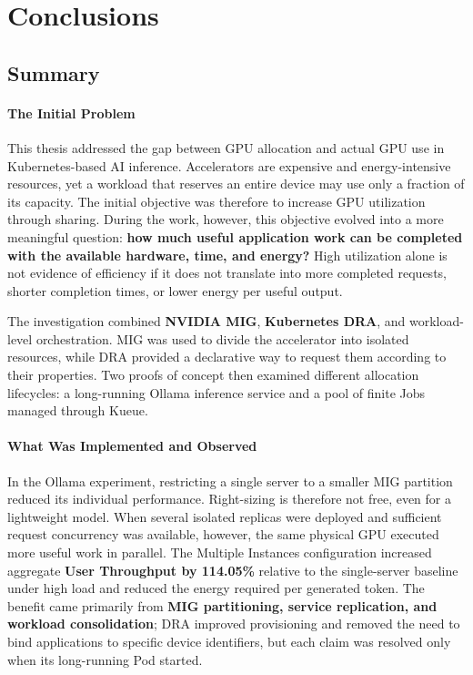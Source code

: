 \chapter{Conclusions}
\label{chap:conclusions}

\section{Summary}
\label{sec:conclusion-summary}

\subsubsection*{The Initial Problem}

This thesis addressed the gap between GPU allocation and actual GPU use in Kubernetes-based AI inference. Accelerators are expensive and energy-intensive resources, yet a workload that reserves an entire device may use only a fraction of its capacity. The initial objective was therefore to increase GPU utilization through sharing. During the work, however, this objective evolved into a more meaningful question: \textbf{how much useful application work can be completed with the available hardware, time, and energy?} High utilization alone is not evidence of efficiency if it does not translate into more completed requests, shorter completion times, or lower energy per useful output.

The investigation combined \textbf{NVIDIA MIG}, \textbf{Kubernetes DRA}, and workload-level orchestration. MIG was used to divide the accelerator into isolated resources, while DRA provided a declarative way to request them according to their properties. Two proofs of concept then examined different allocation lifecycles: a long-running Ollama inference service and a pool of finite Jobs managed through Kueue.

\subsubsection*{What Was Implemented and Observed}

In the Ollama experiment, restricting a single server to a smaller MIG partition reduced its individual performance. Right-sizing is therefore not free, even for a lightweight model. When several isolated replicas were deployed and sufficient request concurrency was available, however, the same physical GPU executed more useful work in parallel. The Multiple Instances configuration increased aggregate \textbf{User Throughput by 114.05\%} relative to the single-server baseline under high load and reduced the energy required per generated token. The benefit came primarily from \textbf{MIG partitioning, service replication, and workload consolidation}; DRA improved provisioning and removed the need to bind applications to specific device identifiers, but each claim was resolved only when its long-running Pod started.

